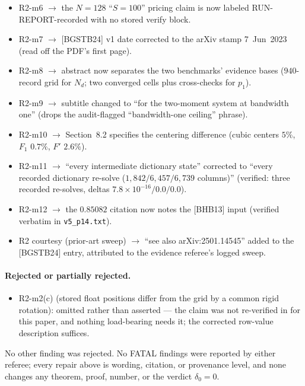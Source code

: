 \documentclass[11pt]{article}
\theoremstyle{plain}
\theoremstyle{definition}
\theoremstyle{remark}
\newcommand{\Nd}{N_{d}}
\begin{document}
\begin{itemize}
  \texttt{I\_identity\_}\allowbreak\texttt{maxerr} $= 2.18 \times 10^{-11}$); also corrected at source
  in \texttt{pair-channel.md}.
\item R2-m6 $\to$ the $N = 128$ ``$S = 100$'' pricing claim is now labeled
  RUN-REPORT-recorded with no stored verify block.
\item R2-m7 $\to$ [BGSTB24] v1 date corrected to the arXiv stamp 7~Jun~2023
  (read off the PDF's first page).
\item R2-m8 $\to$ abstract now separates the two benchmarks' evidence bases
  ($940$-record grid for $\Nd$; two converged cells plus cross-checks for $p_1$).
\item R2-m9 $\to$ subtitle changed to ``for the two-moment system at bandwidth
  one'' (drops the audit-flagged ``bandwidth-one ceiling'' phrase).
\item R2-m10 $\to$ Section~8.2 specifies the centering difference (cubic centers
  $5\%$, $F_1$ $0.7\%$, $F'$ $2.6\%$).
\item R2-m11 $\to$ ``every intermediate dictionary state'' corrected to ``every
  recorded dictionary re-solve ($1{,}842 / 6{,}457 / 6{,}739$ columns)''
  (verified: three recorded re-solves, deltas
  $7.8 \times 10^{-16} / 0.0 / 0.0$).
\item R2-m12 $\to$ the $0.85082$ citation now notes the [BHB13] input (verified
  verbatim in \texttt{v5\_p14.txt}).
\item R2 courtesy (prior-art sweep) $\to$ ``see also arXiv:2501.14545'' added to
  the [BGSTB24] entry, attributed to the evidence referee's logged sweep.
\end{itemize}

\paragraph{Rejected or partially rejected.}

\begin{itemize}
\item R2-m2(c) (stored float positions differ from the grid by a common rigid
  rotation): omitted rather than asserted --- the claim was not re-verified in
  for this paper, and nothing load-bearing needs it; the corrected row-value
  description suffices.
\end{itemize}

No other finding was rejected. No FATAL findings were reported by either referee;
every repair above is wording, citation, or provenance level, and none changes
any theorem, proof, number, or the verdict $\delta_0 = 0$.
\end{document}
